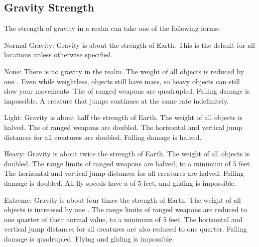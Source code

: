   \subsection{Gravity Strength} The strength of gravity in a realm can take one of the following forms:
    \begin{raggeditemize}
      \item Normal Gravity: Gravity is about the strength of Earth.
          This is the default for all locations unless otherwise specified.
      \item None: There is no gravity in the realm.
        The weight of all objects is reduced by one .
        Even while weightless, objects still have mass, so heavy objects can still slow your movements.
        The  of ranged weapons are quadrupled.
        Falling damage is impossible.
        A creature that jumps continues at the same rate indefinitely.
      \item Light: Gravity is about half the strength of Earth.
        The weight of all objects is halved.
        The  of ranged weapons are doubled.
        The horizontal and vertical jump distances for all creatures are doubled.
        Falling damage is halved.
      \item Heavy: Gravity is about twice the strength of Earth.
        The weight of all objects is doubled.
        The range limits of ranged weapons are halved, to a minimum of 5 feet.
        The horizontal and vertical jump distances for all creatures are halved.
        Falling damage is doubled.
        All fly speeds have a  of 5 feet, and gliding is impossible.
      \item Extreme: Gravity is about four times the strength of Earth.
        The weight of all objects is increased by one .
        The range limits of ranged weapons are reduced to one quarter of their normal value, to a minimum of 5 feet.
        The horizontal and vertical jump distances for all creatures are also reduced to one quarter.
        Falling damage is quadrupled.
        Flying and gliding is impossible.
    \end{raggeditemize}

